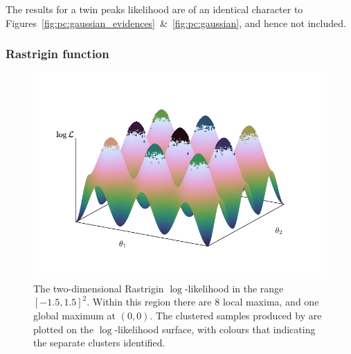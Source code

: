 The results for a twin peaks likelihood are of an identical character to Figures~\ref{fig:pc:gaussian_evidences}~\&~\ref{fig:pc:gaussian}, and hence not included.

\subsubsection{Rastrigin function}
\label{sec:pc:rastrigin}

\begin{figure}[tp]
  \centering
  \includegraphics[width=\columnwidth]{chapter_polychord/figures/rastrigin}
  \caption{The two-dimensional Rastrigin $\log$-likelihood in the range ${[-1.5,1.5]}^2$. Within this region there are $8$ local maxima, and one global maximum at $(0,0)$. The clustered samples produced by \PolyChord{} are plotted on the $\log$-likelihood surface, with colours that indicating the separate clusters identified.\label{fig:pc:rastrigin}}
\end{figure}

